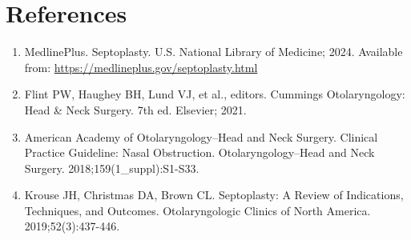 \section*{References}
\begin{enumerate}
  \item MedlinePlus. Septoplasty. U.S. National Library of Medicine; 2024. Available from: \url{https://medlineplus.gov/septoplasty.html}
  \item Flint PW, Haughey BH, Lund VJ, et al., editors. Cummings Otolaryngology: Head \& Neck Surgery. 7th ed. Elsevier; 2021.
  \item American Academy of Otolaryngology--Head and Neck Surgery. Clinical Practice Guideline: Nasal Obstruction. Otolaryngology--Head and Neck Surgery. 2018;159(1\_suppl):S1-S33.
  \item Krouse JH, Christmas DA, Brown CL. Septoplasty: A Review of Indications, Techniques, and Outcomes. Otolaryngologic Clinics of North America. 2019;52(3):437-446.
\end{enumerate}

\clearpage

